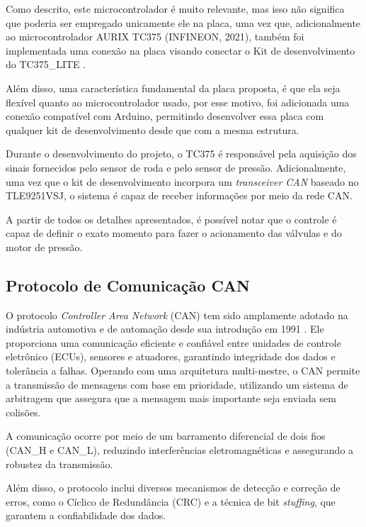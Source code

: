 Como descrito, este microcontrolador é muito relevante, mas isso não significa que poderia ser empregado unicamente ele na placa, uma vez que, adicionalmente ao microcontrolador AURIX TC375 (INFINEON, 2021), também foi implementada uma conexão na placa visando conectar o Kit de desenvolvimento do TC375\_LITE \cite{tc37xEvaluationBoard}. 

Além disso, uma característica fundamental da placa proposta, é que ela seja flexível quanto ao microcontrolador usado, por esse motivo, foi adicionada uma conexão compatível com Arduino, permitindo desenvolver essa placa com qualquer kit de desenvolvimento desde que com a mesma estrutura.

Durante o desenvolvimento do projeto, o TC375 é responsável pela aquisição dos sinais fornecidos pelo sensor de roda e pelo sensor de pressão. Adicionalmente, uma vez que o kit de desenvolvimento incorpora um \textit{transceiver CAN} baseado no \gls{TLE9251VSJ}, o sistema é capaz de receber informações por meio da rede \gls{CAN}.

A partir de todos os detalhes apresentados, é possível notar que o controle é capaz de definir o exato momento para fazer o acionamento das válvulas e do motor de pressão. 


\subsection{Protocolo de Comunicação CAN}
\label{sec:metodologia-6-6}

 O protocolo \textit{Controller Area Network} (CAN) tem sido amplamente adotado na indústria automotiva e de automação desde sua introdução em 1991 \cite{wiley2022}. Ele proporciona uma comunicação eficiente e confiável entre unidades de controle eletrônico (ECUs), sensores e atuadores, garantindo integridade dos dados e tolerância a falhas. Operando com uma arquitetura multi-mestre, o CAN permite a transmissão de mensagens com base em prioridade, utilizando um sistema de arbitragem que assegura que a mensagem mais importante seja enviada sem colisões. 
 
 A comunicação ocorre por meio de um barramento diferencial de dois fios (CAN\_H e CAN\_L), reduzindo interferências eletromagnéticas e assegurando a robustez da transmissão.
 
 Além disso, o protocolo inclui diversos mecanismos de detecção e correção de erros, como o Cíclico de Redundância (CRC) e a técnica de bit \textit{stuffing}, que garantem a confiabilidade dos dados.
 

